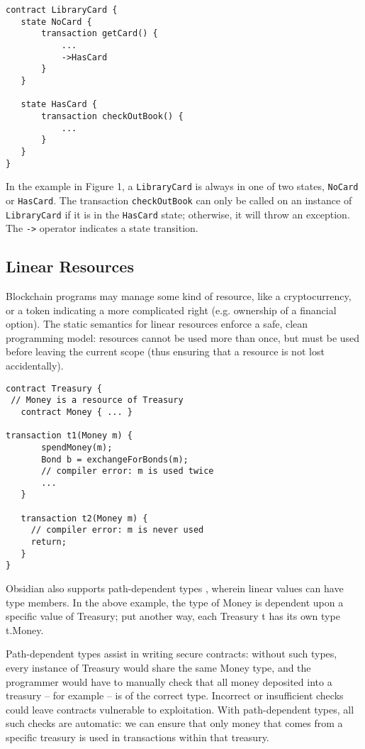 \documentclass[sigplan,10pt,review]{acmart}\settopmatter{printfolios=true}
\begin{document}
\begin{lstlisting}[caption={An example of states in Obsidian.},captionpos=b]
contract LibraryCard {
   state NoCard {
       transaction getCard() {
           ...
           ->HasCard
       }
   }
  
   state HasCard {
       transaction checkOutBook() {
           ...
       }
   }
}
\end{lstlisting}

In the example in Figure 1,  a \texttt{\small{LibraryCard}} is always in one of two
states, \texttt{\small{NoCard}} or \texttt{\small{HasCard}}. The transaction 
\texttt{\small{checkOutBook}} can only be called on an instance of 
\texttt{\small{LibraryCard}} if it is in the \texttt{\small{HasCard}} state; otherwise, it will throw an exception. 
The \texttt{\small{->}} operator indicates a state transition.

\subsection{Linear Resources}

Blockchain programs may manage some kind of resource, like a cryptocurrency, or a token 
indicating a more complicated right (e.g. ownership of a financial option). The static semantics for linear resources \cite{Wadler} 
enforce a safe, clean programming model: resources cannot be used more than once, but must be 
used before leaving the current scope (thus ensuring that a resource is not lost accidentally). 

\begin{lstlisting}[caption={Linear resources in Obsidian},captionpos=b]
contract Treasury {
 // Money is a resource of Treasury
   contract Money { ... }

transaction t1(Money m) {
       spendMoney(m);
       Bond b = exchangeForBonds(m);
       // compiler error: m is used twice
       ...
   }

   transaction t2(Money m) {
     // compiler error: m is never used
     return;
   }
}
\end{lstlisting}

Obsidian also supports path-dependent types \cite{Amin}, wherein linear values can have type members. In the 
above example, the type of Money is dependent upon a specific value of Treasury; put another way, 
each Treasury t has its own type t.Money. 

Path-dependent types assist in writing secure contracts: without such types, every instance of 
Treasury would share the same Money type, and the programmer would have to manually check 
that all money deposited into a treasury -- for example -- is of the correct type. Incorrect or insufficient 
checks could leave contracts vulnerable to exploitation. With path-dependent types, all such checks 
are automatic: we can ensure that only money that comes from a specific treasury is used in 
transactions within that treasury. 
\end{document}
